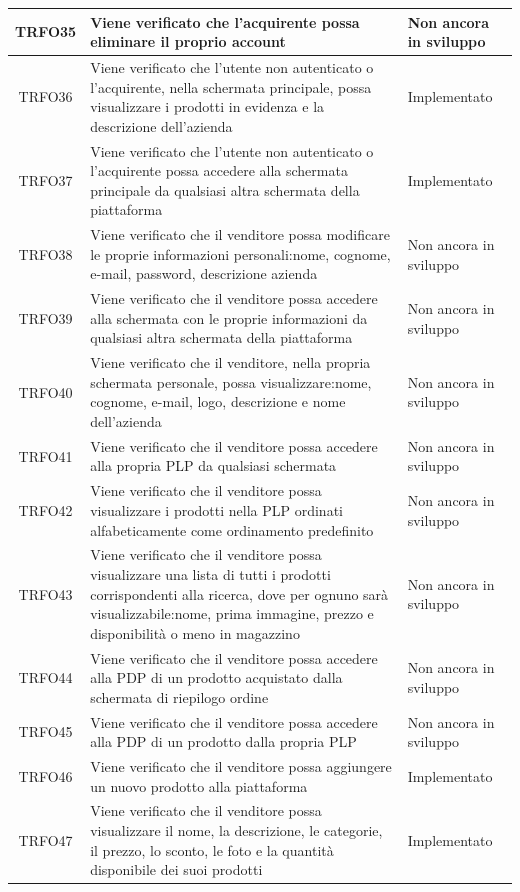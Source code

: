 \begin{longtable}{|c| C{10cm} |C{3cm}|}
	TRFO35 & Viene verificato che l'acquirente possa eliminare il proprio account & Non ancora in sviluppo\\ \hline
	TRFO36 & Viene verificato che l'utente non autenticato o l'acquirente, nella schermata principale, possa visualizzare i prodotti in evidenza e la descrizione dell'azienda & Implementato\\ \hline
	TRFO37 & Viene verificato che l'utente non autenticato o l'acquirente possa accedere alla schermata principale da qualsiasi altra schermata della piattaforma & Implementato\\ \hline
    TRFO38 & Viene verificato che il venditore possa modificare le proprie informazioni personali:nome, cognome, e-mail, password, descrizione azienda & Non ancora in sviluppo\\ \hline
	TRFO39 & Viene verificato che il venditore possa accedere alla schermata con le proprie informazioni da qualsiasi altra schermata della piattaforma & Non ancora in sviluppo\\ \hline
    TRFO40 & Viene verificato che il venditore, nella propria schermata personale, possa visualizzare:nome, cognome, e-mail, logo, descrizione e nome dell'azienda & Non ancora in sviluppo\\ \hline
	TRFO41 & Viene verificato che il venditore possa accedere alla propria PLP da qualsiasi schermata & Non ancora in sviluppo\\ \hline
	TRFO42 & Viene verificato che il venditore possa visualizzare i prodotti nella PLP ordinati alfabeticamente come ordinamento predefinito & Non ancora in sviluppo\\ \hline
	TRFO43 & Viene verificato che il venditore possa visualizzare una lista di tutti i prodotti corrispondenti alla ricerca, dove per ognuno sarà visualizzabile:nome, prima immagine, prezzo e disponibilità o meno in magazzino & Non ancora in sviluppo\\ \hline
	TRFO44 & Viene verificato che il venditore possa accedere alla PDP di un prodotto acquistato dalla schermata di riepilogo ordine & Non ancora in sviluppo\\ \hline
	TRFO45 & Viene verificato che il venditore possa accedere alla PDP di un prodotto dalla propria PLP & Non ancora in sviluppo\\ \hline
    	TRFO46 & Viene verificato che il venditore possa aggiungere un nuovo prodotto alla piattaforma & Implementato\\ \hline
    	TRFO47 & Viene verificato che il venditore possa visualizzare il nome, la descrizione, le categorie, il prezzo, lo sconto, le foto e la quantità disponibile dei suoi prodotti & Implementato\\ \hline

\end{longtable}
